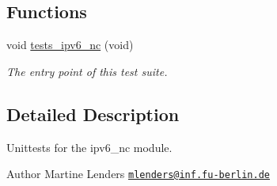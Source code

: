 \subsection*{Functions}
\begin{DoxyCompactItemize}
\item 
void \hyperlink{group__unittests_ga011adecd50fb31c2e9fb4b402259fab3}{tests\+\_\+ipv6\+\_\+nc} (void)
\begin{DoxyCompactList}\small\item\em The entry point of this test suite. \end{DoxyCompactList}\end{DoxyCompactItemize}


\subsection{Detailed Description}
Unittests for the {\ttfamily ipv6\+\_\+nc} module. 

\begin{DoxyAuthor}{Author}
Martine Lenders \href{mailto:mlenders@inf.fu-berlin.de}{\tt mlenders@inf.\+fu-\/berlin.\+de} 
\end{DoxyAuthor}
